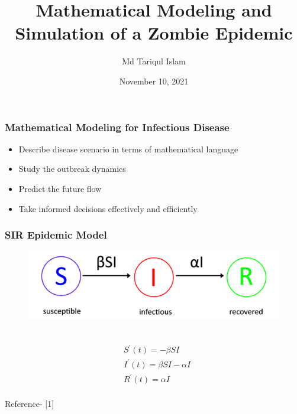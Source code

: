 \documentclass{beamer}
\title{Mathematical Modeling and Simulation of a Zombie Epidemic}
\subtitle{}
\author{Md Tariqul Islam}
\institute{Universit\"at Koblenz - Landau}
\date{November 10, 2021}
\begin{document}
\begin{frame}
\titlepage
\end{frame}



\begin{frame}
\frametitle{Mathematical Modeling for Infectious Disease}
\begin{itemize}
	\item Describe disease scenario in terms of mathematical language
	
	\item Study the outbreak dynamics
	
	\item Predict the future flow
	
	\item Take informed decisions effectively and efficiently
\end{itemize}
\end{frame}



\begin{frame}
\frametitle{SIR Epidemic Model}

\begin{figure}[H]
\centering
\includegraphics[scale=1.0]{SIR.png}
\label{fig:SIR Model}
\end{figure}
~\\
\begin{equation*}
\begin{aligned}
&S^{\prime}(t)=-\beta SI \\
&I^{\prime}(t)=\beta SI - \alpha I \\
&R^{\prime}(t)=\alpha I \\
\end{aligned}
\end{equation*}

\tiny{Reference- [1]}
\end{frame}
\end{document}
